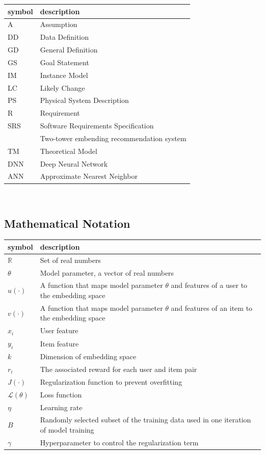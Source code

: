 \documentclass[12pt]{article}
\begin{document}
\renewcommand{\arraystretch}{1.2}
\begin{tabular}{l l} 
  \toprule		
  \textbf{symbol} & \textbf{description}\\
  \midrule 
  A & Assumption\\
  DD & Data Definition\\
  GD & General Definition\\
  GS & Goal Statement\\
  IM & Instance Model\\
  LC & Likely Change\\
  PS & Physical System Description\\
  R & Requirement\\
  SRS & Software Requirements Specification\\
  \progname{} & Two-tower embending recommendation system\\
  TM & Theoretical Model\\
  DNN & Deep Neural Network\\
  ANN & Approximate Nearest Neighbor\\
  \bottomrule
\end{tabular}\\


\subsection{Mathematical Notation}

\renewcommand{\arraystretch}{1.2}
\begin{tabular}{l l}
\toprule
\textbf{symbol} & \textbf{description}\\
\midrule
$\mathbb{R}$ & Set of real numbers\\
$\theta$ & Model parameter, a vector of real numbers\\
$u(\cdot)$ & A function that maps model parameter $\theta$ and features of a user to the embedding space\\
$v(\cdot)$ & A function that maps model parameter $\theta$ and features of an item to the embedding space\\
$x_i$ & User feature\\
$y_i$ & Item feature\\
$k$ & Dimension of embedding space\\
$r_i$ & The associated reward for each user and item pair\\
$J(\cdot)$ & Regularization function to prevent overfitting\\
$\mathcal{L}(\theta)$ & Loss function\\
$\eta $ & Learning rate\\
$B $ & Randomly selected subset of the training data used in one iteration of model training\\
$\gamma$ & Hyperparameter to control the regularization term\\
\bottomrule
\end{tabular}\\
\end{document}
